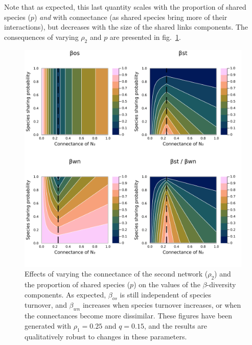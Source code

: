 \documentclass[11pt]{article}
\makeatletter
\def\maxwidth{\ifdim\Gin@nat@width>\linewidth\linewidth
\else\Gin@nat@width\fi}
\let\Oldincludegraphics\includegraphics
\renewcommand{\includegraphics}[1]{\Oldincludegraphics[width=\maxwidth]{#1}}
\makeatother
\begin{document}
Note that as expected, this last quantity scales with the proportion of
shared species (\(p\)) \emph{and} with connectance (as shared species
bring more of their interactions), but decreases with the size of the
shared links components. The consequences of varying \(\rho_2\) and
\(p\) are presented in fig.~\ref{fig:numexp3}.

\begin{figure}
\hypertarget{fig:numexp3}{%
\centering
\includegraphics{figures/numexp3.png}
\caption{Effects of varying the connectance of the second network
(\(\rho_2\)) and the proportion of shared species (\(p\)) on the values
of the \(\beta\)-diversity components. As expected, \(\beta_{os}\) is
still independent of species turnover, and \(\beta_{wn}\) increases when
species turnover increases, or when the connectances become more
dissimilar. These figures have been generated with \(\rho_1 = 0.25\) and
\(q = 0.15\), and the results are qualitatively robust to changes in
these parameters.}\label{fig:numexp3}
}
\end{figure}
\end{document}
